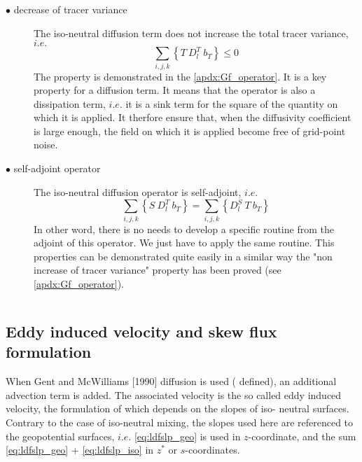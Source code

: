 \documentclass[../tex_main/NEMO_manual]{subfiles}
\begin{document}
\begin{description}
\item[$\bullet$ decrease of tracer variance] The iso-neutral diffusion term does 
not increase the total tracer variance, $i.e.$
\begin{equation} \label{eq:Gf_property1}
\sum_{i,j,k} \left\{ T \ D_l^T \ b_T \right\} \leq 0
\end{equation}
The property is demonstrated in the \autoref{apdx:Gf_operator}. It is a 
key property for a diffusion term. It means that the operator is also a dissipation 
term, $i.e.$ it is a sink term for the square of the quantity on which it is applied. 
It therfore ensure that, when the diffusivity coefficient is large enough, the field 
on which it is applied become free of grid-point noise.

\item[$\bullet$ self-adjoint operator] The iso-neutral diffusion operator is self-adjoint, 
$i.e.$
\begin{equation} \label{eq:Gf_property1}
\sum_{i,j,k} \left\{ S \ D_l^T \ b_T \right\} = \sum_{i,j,k} \left\{ D_l^S \ T \ b_T \right\} 
\end{equation}
In other word, there is no needs to develop a specific routine from the adjoint of this 
operator. We just have to apply the same routine. This properties can be demonstrated 
quite easily in a similar way the "non increase of tracer variance" property has been 
proved (see \autoref{apdx:Gf_operator}).
\end{description}


$\ $\newline      %
\subsection{Eddy induced velocity and skew flux formulation}

When Gent and McWilliams [1990] diffusion is used ( defined), 
an additional advection term is added. The associated velocity is the so called 
eddy induced velocity, the formulation of which depends on the slopes of iso-
neutral surfaces. Contrary to the case of iso-neutral mixing, the slopes used 
here are referenced to the geopotential surfaces, $i.e.$ \autoref{eq:ldfslp_geo} 
is used in $z$-coordinate, and the sum \autoref{eq:ldfslp_geo}
+ \autoref{eq:ldfslp_iso} in $z^*$ or $s$-coordinates. 
\end{document}
